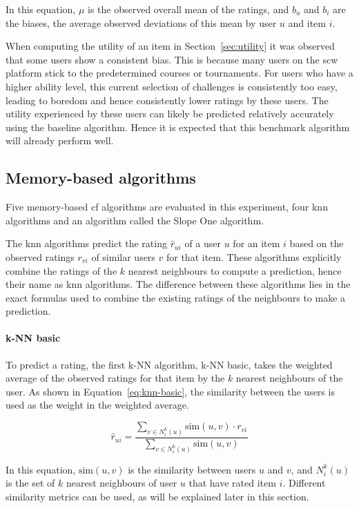 In this equation, $\mu$ is the observed overall mean of the ratings, and $b_u$ and $b_i$ are the biases, the average observed deviations of this mean by user $u$ and item $i$.

When computing the utility of an item in Section~\ref{sec:utility} it was observed that some users show a consistent bias.
This is because many users on the \gls{scw} platform stick to the predetermined courses or tournaments.
For users who have a higher ability level, this current selection of challenges is consistently too easy, leading to boredom and hence consistently lower ratings by these users.
The utility experienced by these users can likely be predicted relatively accurately using the baseline algorithm.
Hence it is expected that this benchmark algorithm will already perform well.

\subsection{Memory-based algorithms}
Five memory-based \gls{cf} algorithms are evaluated in this experiment, four \gls{knn} algorithms and an algorithm called the Slope One algorithm.

The \gls{knn} algorithms predict the rating $\hat{r}_{ui}$ of a user $u$ for an item $i$ based on the observed ratings $r_{vi}$ of similar users $v$ for that item.
These algorithms explicitly combine the ratings of the $k$ nearest neighbours to compute a prediction, hence their name as \gls{knn} algorithms.
The difference between these algorithms lies in the exact formulas used to combine the existing ratings of the neighbours to make a prediction.

\paragraph{k-NN basic}
To predict a rating, the first k-NN algorithm, k-NN basic, takes the weighted average of the observed ratings for that item by the $k$ nearest neighbours of the user.
As shown in Equation~\ref{eq:knn-basic}, the similarity between the users is used as the weight in the weighted average.

\begin{equation}
    \label{eq:knn-basic}
    \hat{r}_{ui} = \frac{\sum\limits_{v \in N_i^k(u)} \text{sim}(u, v) \cdot r_{vi} }{\sum\limits_{v \in N_i^k(u)} \text{sim}(u, v)}
\end{equation}

In this equation, $\text{sim}(u,v)$ is the similarity between users $u$ and $v$, and $N_i^k(u)$ is the set of $k$ nearest neighbours of user $u$ that have rated item $i$.
Different similarity metrics can be used, as will be explained later in this section.

